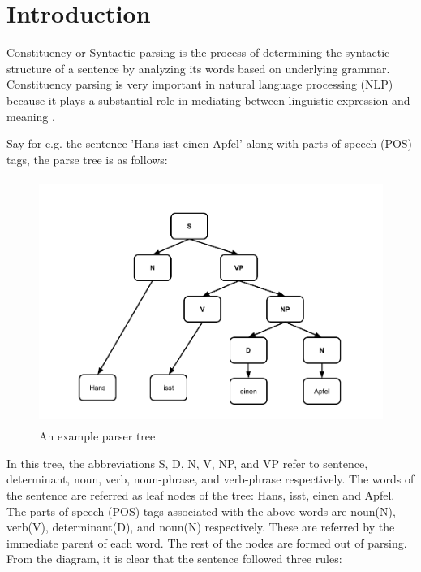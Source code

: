 \documentclass[a4paper, 11pt]{article}
\begin{document}
\tableofcontents
\pagebreak

\listoffigures
\pagebreak

\listoftables
\pagebreak

\clearpage

\section{Introduction}
\frenchspacing

Constituency or Syntactic parsing is the process of determining the syntactic structure of a sentence by analyzing its words based on underlying grammar. Constituency parsing is very important in natural language processing (NLP) because it plays a substantial role in mediating between linguistic expression and meaning \parencite*{Socher}. 

Say for e.g. the sentence 'Hans isst einen Apfel' along with parts of speech (POS) tags, the parse tree is as follows:

\begin{figure}[htpb]
    \centering
    \includegraphics[width=\textwidth,height=8cm,keepaspectratio=true]
    {hans-eats-apples.png}
    \caption{
        An example parser tree
    }
    \label{fig:An example parser tree network}
\end{figure}

In this tree, the abbreviations S, D, N, V, NP, and VP refer to sentence, determinant, noun, verb, noun-phrase, and verb-phrase respectively. The words of the sentence are referred as leaf nodes of the tree: Hans, isst, einen and Apfel. The parts of speech (POS) tags associated with the above words are noun(N), verb(V), determinant(D), and noun(N) respectively. These are referred by the immediate parent of each word. The rest of the nodes are formed out of parsing. From the diagram, it is clear that the sentence followed three rules:
\end{document}

